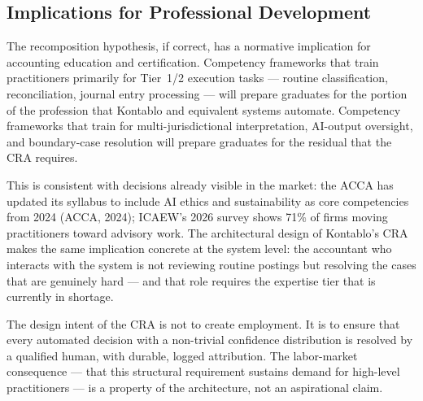 \subsection{Implications for Professional Development}
\label{subsec:professional_development}

The recomposition hypothesis, if correct, has a normative implication for
accounting education and certification. Competency frameworks that train
practitioners primarily for Tier~1/2 execution tasks --- routine
classification, reconciliation, journal entry processing --- will prepare
graduates for the portion of the profession that Kontablo and equivalent
systems automate. Competency frameworks that train for multi-jurisdictional
interpretation, AI-output oversight, and boundary-case resolution will
prepare graduates for the residual that the CRA requires.

This is consistent with decisions already visible in the market: the ACCA
has updated its syllabus to include AI ethics and sustainability as core
competencies from 2024 (ACCA, 2024); ICAEW's 2026 survey shows 71\% of
firms moving practitioners toward advisory work. The architectural design
of Kontablo's CRA makes the same implication concrete at the system level:
the accountant who interacts with the system is not reviewing routine
postings but resolving the cases that are genuinely hard --- and that role
requires the expertise tier that is currently in shortage.

The design intent of the CRA is not to create employment. It is to ensure
that every automated decision with a non-trivial confidence distribution
is resolved by a qualified human, with durable, logged attribution. The labor-market
consequence --- that this structural requirement sustains demand for high-level
practitioners --- is a property of the architecture, not an aspirational claim.
